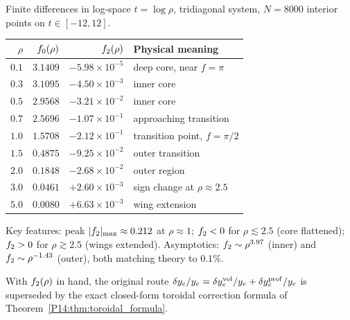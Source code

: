 \begin{remark}
\label{P14:rem:numerical_solution}
Finite differences in log-space $t=\log\rho$, tridiagonal system,
$N=8000$ interior points on $t\in[-12,12]$.
\begin{center}
\begin{tabular}{rrrl}
\toprule
$\rho$ & $f_0(\rho)$ & $f_2(\rho)$ & Physical meaning \\
\midrule
$0.1$ & $3.1409$ & $-5.98\times10^{-5}$ & deep core, near $f=\pi$ \\
$0.3$ & $3.1095$ & $-4.50\times10^{-3}$ & inner core \\
$0.5$ & $2.9568$ & $-3.21\times10^{-2}$ & inner core \\
$0.7$ & $2.5696$ & $-1.07\times10^{-1}$ & approaching transition \\
$1.0$ & $1.5708$ & $-2.12\times10^{-1}$ & transition point, $f=\pi/2$ \\
$1.5$ & $0.4875$ & $-9.25\times10^{-2}$ & outer transition \\
$2.0$ & $0.1848$ & $-2.68\times10^{-2}$ & outer region \\
$3.0$ & $0.0461$ & $+2.60\times10^{-3}$ & sign change at $\rho\approx2.5$ \\
$5.0$ & $0.0080$ & $+6.63\times10^{-3}$ & wing extension \\
\bottomrule
\end{tabular}
\end{center}
Key features: peak $|f_2|_{\max}\approx0.212$ at $\rho\approx1$;
$f_2<0$ for $\rho\lesssim2.5$ (core flattened);
$f_2>0$ for $\rho\gtrsim2.5$ (wings extended).
Asymptotics: $f_2\sim\rho^{3.97}$ (inner) and $f_2\sim\rho^{-1.43}$ (outer),
both matching theory to $0.1\%$.
\end{remark}

\begin{remark}
\label{P14:rem:yukawa}
With $f_2(\rho)$ in hand, the original route
$\delta y_e/y_e = \delta y_e^{\rm vol}/y_e + \delta y_e^{\rm prof}/y_e$
is superseded by the exact closed-form toroidal correction formula of
Theorem~\ref{P14:thm:toroidal_formula}.
\end{remark}


